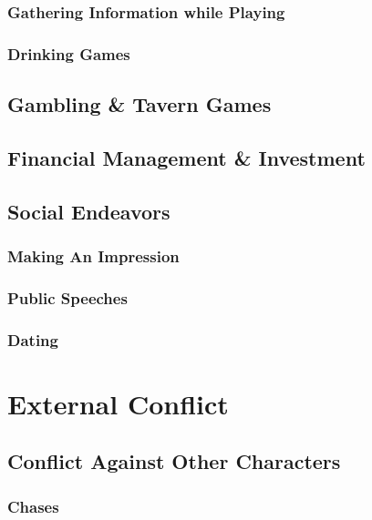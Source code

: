 \documentclass[twocolumn]{dndbook}
\begin{document}
\subsection{Gathering Information while Playing}

\subsection{Drinking Games}

\section{Gambling \& Tavern Games}

\section{Financial Management \& Investment}


\section{Social Endeavors}
\subsection{Making An Impression}
\subsection{Public Speeches}
\subsection{Dating}

\chapter{External Conflict}
\section{Conflict Against Other Characters}
\subsection{Chases}
\end{document}
